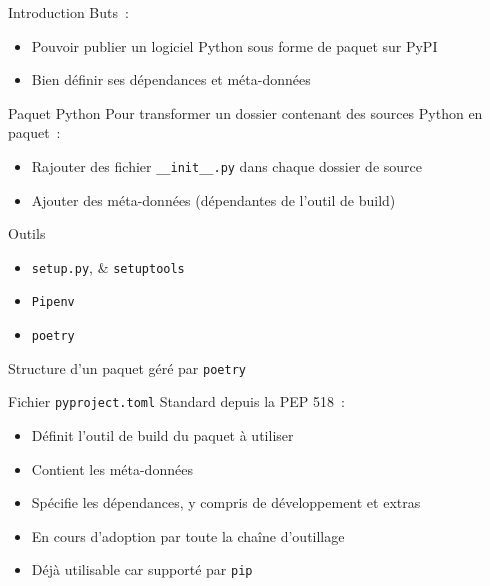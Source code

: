 \begin{frame}{Introduction}
  Buts~:
  \begin{itemize}[<+->]
    \item Pouvoir publier un logiciel Python sous forme de paquet sur PyPI
    \item Bien définir ses dépendances et méta-données
  \end{itemize}
\end{frame}

\begin{frame}{Paquet Python}
  Pour transformer un dossier contenant des sources Python en paquet~:

  \begin{itemize}[<+->]
    \item Rajouter des fichier \texttt{\_\_init\_\_.py} dans chaque dossier de source
    \item Ajouter des méta-données (dépendantes de l'outil de build)
  \end{itemize}
\end{frame}

\begin{frame}{Outils}

  \begin{itemize}[<+->]
    \item \texttt{setup.py}, \& \texttt{setuptools}
    \item \texttt{Pipenv}
    \item \texttt{poetry}
  \end{itemize}

\end{frame}

\begin{frame}{Structure d'un paquet géré par \texttt{poetry}}
\end{frame}

\begin{frame}{Fichier \texttt{pyproject.toml}}
  Standard depuis la PEP 518~:

  \begin{itemize}[<+->]
    \item Définit l'outil de build du paquet à utiliser
    \item Contient les méta-données
    \item Spécifie les dépendances, y compris de développement et extras
    \item En cours d'adoption par toute la chaîne d'outillage
    \item Déjà utilisable car supporté par \texttt{pip}
  \end{itemize}
\end{frame}

